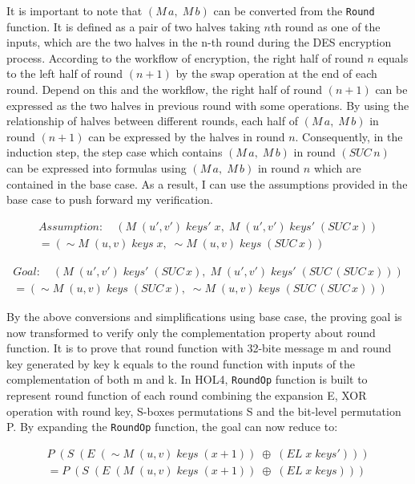 \documentclass{article}
\begin{document}
It is important to note that $(M \,a,\;M \,b)$ can be converted from the \verb|Round| function. It is defined as a pair of two
halves taking $n$th round as one of the inputs,
which are the two halves in the n-th round during the DES encryption process. According to the workflow of encryption, the right
half of round $n$ equals to the left half of round $(n+1)$ by the swap operation at the end of each round. Depend on this and the workflow,
the right half of round $(n+1)$ can be expressed as the two halves in previous round with some operations.
By using the relationship of halves between different rounds,
each half of $(M \,a,\;M \,b)$ in round $(n+1)$ can be expressed by the halves in round $n$. Consequently, in the induction step,
the step case which contains $(M \,a,\;M \,b)$ in round $(SUC \,n)$ can be expressed into formulas using $(M \,a,\;M \,b)$ in round
$n$ which are contained in the base case. As a result, I can use the assumptions provided in the base case to push forward my
verification.

\begin{multline*}
Assumption: \quad (M \; (u', v') \; keys' \; x, \; M \; (u', v') \; keys' \; (SUC \, x)) \\
= (\sim M \; (u, v) \; keys \; x, \; \sim M \; (u, v) \; keys \; (SUC \, x))
\end{multline*}

\begin{multline*}
Goal: \quad (M \; (u', v') \; keys' \; (SUC \,x), \; M \; (u', v') \; keys' \; (SUC \,(SUC \, x))) \\
= (\sim M \; (u, v) \; keys \; (SUC \,x), \; \sim M \; (u, v) \; keys \; (SUC \,(SUC \, x)))
\end{multline*}

By the above conversions and simplifications using base case, the proving goal is now transformed to verify only the
complementation property about round function. It is to prove that round function with 32-bite message m and round
key generated by key k equals to the round function with inputs of
the complementation of both m and k. In HOL4, \verb|RoundOp| function is built to represent round function of each round
combining the expansion E, XOR operation with round key, S-boxes permutations S and the bit-level permutation P. By expanding
the \verb|RoundOp| function, the goal can now reduce to:

\begin{multline*}
P \; (S \; (E \;(\sim M \; (u, v) \; keys \; (x+1)) \; \oplus \; (EL \;x \;keys')))\\
= P \; (S \; (E \;(M \; (u, v) \; keys \; (x+1)) \;\oplus \;(EL \;x \;keys)))
\end{multline*}
\end{document}
